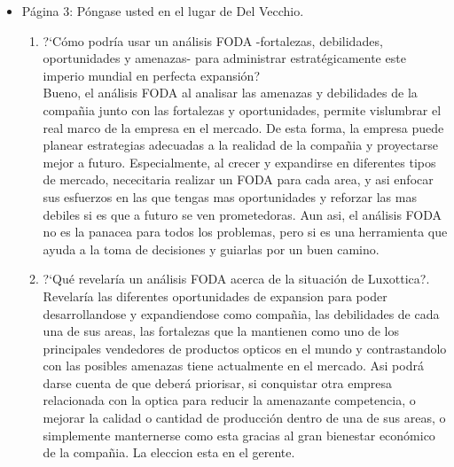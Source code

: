\begin{itemize}
	\item P\'agina 3: P\'ongase usted en el lugar de Del Vecchio. \\
	\begin{enumerate}
		\item ?`C\'omo podr\'ia usar un an\'alisis FODA -fortalezas, debilidades, oportunidades y amenazas- para administrar estrat\'egicamente este imperio mundial en perfecta expansi\'on?\\
		Bueno, el an\'alisis FODA al analisar las amenazas y debilidades de la compa\~nia junto con las fortalezas y oportunidades, permite vislumbrar el real marco de la empresa en el mercado. De esta forma, la empresa puede planear estrategias adecuadas a la realidad de la compa\~nia y proyectarse mejor a futuro. Especialmente, al crecer y expandirse en diferentes tipos de mercado, nececitaria realizar un FODA para cada area, y asi enfocar sus esfuerzos en las que tengas mas oportunidades y reforzar las mas debiles si es que a futuro se ven prometedoras. Aun asi, el an\'alisis FODA no es la panacea para todos los problemas, pero si es una herramienta que ayuda a la toma de decisiones y guiarlas por un buen camino. 

		\item ?`Qu\'e revelar\'ia un an\'alisis FODA acerca de la situaci\'on de Luxottica?.\\
		Revelar\'ia las diferentes oportunidades de expansion para poder desarrollandose y expandiendose como compa\~nia, las debilidades de cada una de sus areas, las fortalezas que la mantienen como uno de los principales vendedores de productos opticos en el mundo y contrastandolo con las posibles amenazas tiene actualmente en el mercado.	Asi podr\'a darse cuenta de que deber\'a priorisar, si conquistar otra empresa relacionada con la optica para reducir la amenazante competencia, o mejorar la calidad o cantidad de producci\'on dentro de una de sus areas, o simplemente manternerse como esta gracias al gran bienestar econ\'omico de la compa\~nia. La eleccion esta en el gerente.
	\end{enumerate}


\end{itemize}
